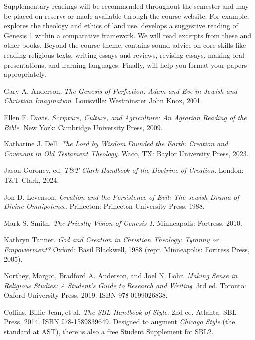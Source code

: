 \documentclass[titlepage]{article}
\begin{document}
Supplementary readings will be recommended throughout the semester and
may be placed on reserve or made available through the course website.
For example, \cite{ed} explores the theology and ethics of land use.
\cite{ms} develops a suggestive reading of Genesis 1 within a
comparative framework. We will read excerpts from these and other books.
Beyond the course theme, \cite{rlgs} contains sound advice on core
skills like reading religious texts, writing essays and reviews,
revising essays, making oral presentations, and learning languages.
Finally, \cite{sbl2} will help you format your papers appropriately.

\begingroup
\renewcommand{\section}[2]{}%
\begin{thebibliography}{Making Sense}%

	 Gary A. Anderson.
	\emph{The Genesis of Perfection: Adam and Eve in Jewish and Christian Imagination}.
	Louisville: Westminster John Knox, 2001.

	 Ellen F. Davis.
	\emph{Scripture, Culture, and Agriculture: An Agrarian Reading of the Bible}.
	New York: Cambridge University Press, 2009.

	 Katharine J. Dell.
	\emph{The Lord by Wisdom Founded the Earth: Creation and Covenant in Old Testament Theology}.
	Waco, TX: Baylor University Press, 2023.

	 Jason Goroncy, ed.
	\emph{T\&T Clark Handbook of the Doctrine of Creation}.
	London: T\&T Clark, 2024.

	 Jon D. Levenson.
	\emph{Creation and the Persistence of Evil: The Jewish Drama of Divine Omnipotence}.
	Princeton: Princeton University Press, 1988. %

	 Mark S. Smith.
	\emph{The Priestly Vision of Genesis 1}.
	Minneapolis: Fortress, 2010.

	 Kathryn Tanner.
	\emph{God and Creation in Christian Theology: Tyranny or Empowerment?}
	Oxford: Basil Blackwell, 1988 (repr. Minneapolis: Fortress Press, 2005).

	 Northey, Margot, Bradford A. Anderson, and Joel N. Lohr.
	\emph{Making Sense in Religious Studies: A Student's Guide to Research and Writing}.
	3rd ed. Toronto: Oxford University Press, 2019. ISBN 978-0199026838.

	 Collins, Billie Jean, et al.
	\emph{The SBL Handbook of Style}.
	2nd ed. Atlanta: SBL Press, 2014. ISBN 978-1589839649.
	Designed to augment \href{http://www.chicagomanualofstyle.org/home.html}{\emph{Chicago Style}}
	(the standard at AST), there is also a free
	\href{https://www.sbl-site.org/wp-content/uploads/2025/04/SBLHSsupp2015-02.pdf}{Student Supplement for SBL2}.

\end{thebibliography}
\endgroup
\end{document}
